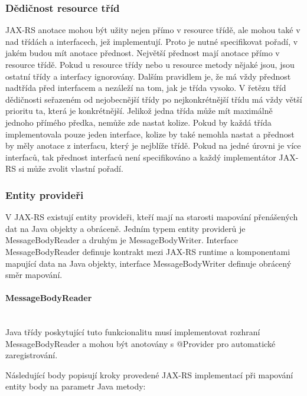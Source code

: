 \documentclass[11pt,twoside,a4paper]{book}
\begin{document}
\subsubsection{Dědičnost resource tříd}

JAX-RS anotace mohou být užity nejen přímo v resource třídě, ale mohou také v nad třídách a
interfacech, jež implementují. Proto je nutné specifikovat pořadí, v jakém budou mít anotace
přednost. Největší přednost mají anotace přímo v resource třídě. Pokud u resource třídy nebo
u resource metody nějaké jsou, jsou ostatní třídy a interfacy ignorovány. Dalším pravidlem je,
že má vždy přednost nadtřída před interfacem a nezáleží na tom, jak je třída vysoko. V řetězu
tříd dědičnosti seřazeném od nejobecnější třídy po nejkonkrétnější třídu má vždy větší prioritu
ta, která je konkrétnější. Jelikož jedna třída může mít maximálně jednoho přímého předka,
nemůže zde nastat kolize. Pokud by každá třída implementovala pouze jeden interface, kolize
by také nemohla nastat a přednost by měly anotace z interfacu, který je nejblíže třídě. Pokud
na jedné úrovni je více interfaců, tak přednost interfaců není specifikováno a každý
implementátor JAX-RS si může zvolit vlastní pořadí.

\subsubsection{Entity provideři}

V JAX-RS existují entity provideři, kteří mají na starosti mapování přenášených
dat na Java objekty a obráceně. Jedním typem entity providerů je MessageBodyReader a druhým 
je MessageBodyWriter.  Interface MessageBodyReader definuje kontrakt mezi JAX-RS runtime a 
komponentami mapující data na Java objekty, interface MessageBodyWriter definuje obrácený 
směr mapování. 

\paragraph{MessageBodyReader}
\mbox{}\\

Java třídy poskytující tuto funkcionalitu musí implementovat rozhraní
MessageBodyReader a mohou být anotovány s @Provider pro automatické zaregistrování.

Následující body popisují kroky provedené JAX-RS implementací při mapování
entity body na parametr Java metody:
\end{document}
